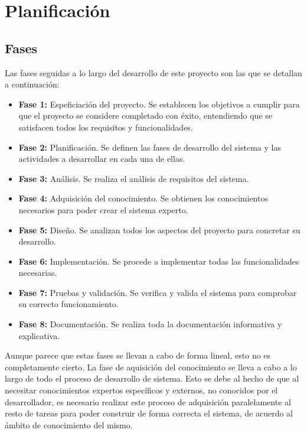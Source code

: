 \chapter{Planificación}

\section{Fases}

Las fases seguidas a lo largo del desarrollo de este proyecto son las que se detallan a continuación:

\begin{itemize}
	\item \textbf{Fase 1:} Espeficiación del proyecto. Se establecen los objetivos a cumplir para que el proyecto se considere completado con éxito, entendiendo que se satisfacen todos los requisitos y funcionalidades.
	\item \textbf{Fase 2:} Planificación. Se definen las fases de desarrollo del sistema y las actividades a desarrollar en cada una de ellas.
	\item \textbf{Fase 3:} Análisis. Se realiza el análisis de requisitos del sistema. 
	\item \textbf{Fase 4:} Adquisición del conocimiento. Se obtienen los conocimientos necesarios para poder crear el sistema experto.
	\item \textbf{Fase 5:} Diseño. Se analizan todos los aspectos del proyecto para concretar su desarrollo.
	\item \textbf{Fase 6:} Implementación. Se procede a implementar todas las funcionalidades necesarias.
	\item \textbf{Fase 7:} Pruebas y validación. Se verifica y valida el sistema para comprobar su correcto funcionamiento.
	\item \textbf{Fase 8:} Documentación. Se realiza toda la documentación informativa y explicativa.
\end{itemize}

Aunque parece que estas fases se llevan a cabo de forma lineal, esto no es completamente cierto. La fase de aquisición del conocimiento se lleva a cabo a lo largo de todo el proceso de desarrollo de sistema. Esto se debe al hecho de que al necesitar conocimientos expertos específicos y externos, no conocidos por el desarrollador, es necesario realizar este proceso de adquisición paralelamente al resto de tareas para poder construir de forma correcta el sistema, de acuerdo al ámbito de conocimiento del mismo.

